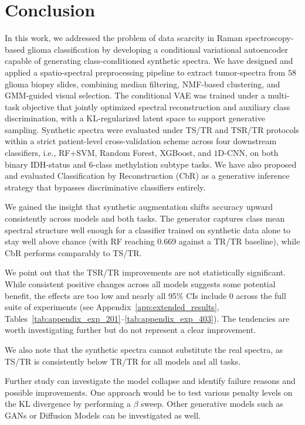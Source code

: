 \chapter{Conclusion}
\label{ch:conclusion}

In this work, we addressed the problem of data scarcity in Raman spectroscopy-based glioma classification by developing a conditional variational autoencoder capable of generating class-conditioned synthetic spectra. We have designed and applied a spatio-spectral preprocessing pipeline to extract tumor-spectra from $58$ glioma biopsy slides, combining median filtering, NMF-based clustering, and GMM-guided visual selection. The conditional VAE was trained under a multi-task objective that jointly optimized spectral reconstruction and auxiliary class discrimination, with a KL-regularized latent space to support generative sampling. Synthetic spectra were evaluated under TS/TR and TSR/TR protocols within a strict patient-level cross-validation scheme across four downstream classifiers, i.e., RF+SVM, Random Forest, XGBoost, and $1$D-CNN, on both binary IDH-status and $6$-class methylation subtype tasks. We have also proposed and evaluated Classification by Reconstruction (CbR) as a generative inference strategy that bypasses discriminative classifiers entirely. 

We gained the insight that synthetic augmentation shifts accuracy upward consistently across models and both tasks. The generator captures class mean spectral structure well enough for a classifier trained on synthetic data alone to stay well above chance (with RF reaching 0.669 against a TR/TR baseline), while CbR performs comparably to TS/TR.

We point out that the TSR/TR improvements are not statistically significant. While consistent positive changes across all models suggests some potential benefit, the effects are too low and nearly all 95\% CIs include 0 across the full suite of experiments (see Appendix~\ref{app:extended_results}, Tables~\ref{tab:appendix_exp_201}--\ref{tab:appendix_exp_403}). The tendencies are worth investigating further but do not represent a clear improvement.

We also note that the synthetic spectra cannot substitute the real spectra, as TS/TR is consistently below TR/TR for all models and all tasks.

Further study can investigate the model collapse and identify failure reasons and possible improvements. One approach would be to test various penalty levels on the KL divergence by performing a $\beta$ sweep. Other generative models such as GANs or Diffusion Models can be investigated as well.
